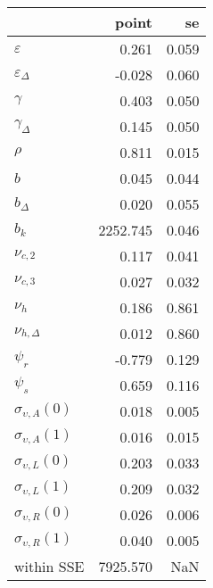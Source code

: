 \begin{tabular}{lrr}
\toprule
{} &     point &     se \\
\midrule
$\varepsilon$            &     0.261 &  0.059 \\
$\varepsilon_{\Delta}$   &    -0.028 &  0.060 \\
$\gamma$                 &     0.403 &  0.050 \\
$\gamma_{\Delta}$        &     0.145 &  0.050 \\
$\rho$                   &     0.811 &  0.015 \\
$b$                      &     0.045 &  0.044 \\
$b_{\Delta}$             &     0.020 &  0.055 \\
$b_k$                    &  2252.745 &  0.046 \\
$\nu_{c,2}$              &     0.117 &  0.041 \\
$\nu_{c,3}$              &     0.027 &  0.032 \\
$\nu_{h}$                &     0.186 &  0.861 \\
$\nu_{h,\Delta}$         &     0.012 &  0.860 \\
$\psi_{r}$               &    -0.779 &  0.129 \\
$\psi_{s}$               &     0.659 &  0.116 \\
$\sigma_{\upsilon,A}(0)$ &     0.018 &  0.005 \\
$\sigma_{\upsilon,A}(1)$ &     0.016 &  0.015 \\
$\sigma_{\upsilon,L}(0)$ &     0.203 &  0.033 \\
$\sigma_{\upsilon,L}(1)$ &     0.209 &  0.032 \\
$\sigma_{\upsilon,R}(0)$ &     0.026 &  0.006 \\
$\sigma_{\upsilon,R}(1)$ &     0.040 &  0.005 \\
within SSE               &  7925.570 &    NaN \\
\bottomrule
\end{tabular}
